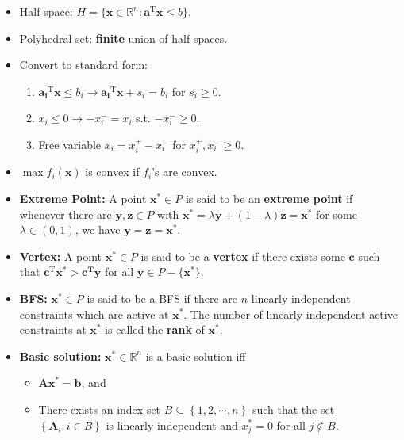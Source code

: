\documentclass[10pt]{article}
\newcommand{\R}{\mathbb{R}}
\begin{document}
    \begin{multicols*}{3}
        \begin{itemize}
            \item Half-space: $H = \{\bm{x} \in \R^n \colon \bm{a}^{\mathrm{T}}\bm{x} \leq b\}$.
            \item Polyhedral set: \textbf{finite} union of half-spaces.
            \item Convert to standard form:
            \begin{enumerate}
                \item $\bm{a_i}^{\mathrm{T}}\bm{x} \leq b_i \longrightarrow \bm{a_i}^{\mathrm{T}}\bm{x} + s_i = b_i$ for $s_i \geq 0$.
                \item $x_i \leq 0 \longrightarrow -x_i^- = x_i$ s.t. $-x_i^- \geq 0$.
                \item Free variable $x_i = x_i^+ - x_i^-$ for $x_i^+, x_i^- \geq 0$.
            \end{enumerate}
            \item $\max f_i(\bm{x})$ is convex if $f_i$'s are convex. 
            \item \textbf{Extreme Point:} A point $\bm{x}^* \in P$ is said to be an \textbf{extreme point} if whenever there are $\bm{y}, \bm{z} \in P$ with $\bm{x}^* = \lambda\bm{y} + (1 - \lambda)\bm{z} = \bm{x}^*$ for some $\lambda \in (0, 1)$, we have $\bm{y = z = x}^*$.
            \item \textbf{Vertex:} A point $\bm{x}^* \in P$ is said to be a \textbf{vertex} if there exists some $\bm{c}$ such that $\bm{c}^{\mathrm{T}}\bm{x}^* > \bm{c}^{\bm{T}}\bm{y}$ for all $\bm{y} \in P - \{\bm{x}^*\}$.
            \item \textbf{BFS:} $\bm{x}^* \in P$ is said to be a BFS if there are $n$ linearly independent constraints which are active at $\bm{x}^*$. The number of linearly independent active constraints at $\bm{x}^*$ is called the \textbf{rank} of $\bm{x}^*$.
            \item \textbf{Basic solution:} $\bm{x}^* \in \R^n$ is a basic solution iff
            \begin{itemize}
                \item $\bm{Ax}^* = \bm{b}$, and
                \item There exists an index set $B \subseteq \left\{1, 2, \cdots, n\right\}$ such that the set $\left\{\bm{A}_i \colon i \in B\right\}$ is linearly independent and $x^*_j = 0$ for all $j \notin B$.
            \end{itemize}

\end{itemize}
\end{multicols*}
\end{document}
